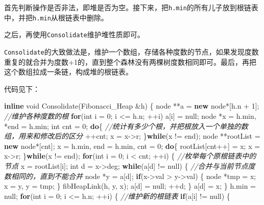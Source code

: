 \documentclass[]{article}
\newenvironment{Shaded}{}{}
\newcommand{\CommentTok}[1]{\textcolor[rgb]{0.38,0.63,0.69}{\textit{#1}}}
\newcommand{\ControlFlowTok}[1]{\textcolor[rgb]{0.00,0.44,0.13}{\textbf{#1}}}
\newcommand{\DataTypeTok}[1]{\textcolor[rgb]{0.56,0.13,0.00}{#1}}
\newcommand{\DecValTok}[1]{\textcolor[rgb]{0.25,0.63,0.44}{#1}}
\newcommand{\KeywordTok}[1]{\textcolor[rgb]{0.00,0.44,0.13}{\textbf{#1}}}
\newcommand{\NormalTok}[1]{#1}
\begin{document}
\begin{itemize}
  首先判断操作是否非法，即堆是否为空。接下来，把\texttt{h.min}的所有儿子放到根链表中，并把\texttt{h.min}从根链表中删除。

  之后，再使用\texttt{Consolidate}维护堆性质即可。

  \texttt{Consolidate}的大致做法是，维护一个数组，存储各种度数的节点，如果发现度数重复的就合并为度数+1的，直到整个森林没有两棵树度数相同即可。最后，再把这个数组拉成一条链，构成堆的根链表。

  代码见下：

\begin{Shaded}
\begin{Highlighting}[]
\KeywordTok{inline} \DataTypeTok{void}\NormalTok{ Consolidate(Fibonacci_Heap &h) \{}
\NormalTok{    node **a = }\KeywordTok{new}\NormalTok{ node*[h.n + }\DecValTok{1}\NormalTok{]; }\CommentTok{//维护各种度数的根}
    \ControlFlowTok{for}\NormalTok{(}\DataTypeTok{int}\NormalTok{ i = }\DecValTok{0}\NormalTok{; i <= h.n; ++i) a[i] = null;}
\NormalTok{    node *x = h.min, *end = h.min;}
    \DataTypeTok{int}\NormalTok{ cnt = }\DecValTok{0}\NormalTok{;}
    \ControlFlowTok{do}\NormalTok{\{ }\CommentTok{//统计有多少个根，并把根放入一个单独的数组，用来和修改后的区分}
\NormalTok{        ++cnt;}
\NormalTok{        x = x->r;}
\NormalTok{    \}}\ControlFlowTok{while}\NormalTok{(x != end);}
\NormalTok{    node **rootList = }\KeywordTok{new}\NormalTok{ node*[cnt];}
\NormalTok{    x = h.min, end = h.min, cnt = }\DecValTok{0}\NormalTok{;}
    \ControlFlowTok{do}\NormalTok{\{}
\NormalTok{        rootList[cnt++] = x;}
\NormalTok{        x = x->r;}
\NormalTok{    \}}\ControlFlowTok{while}\NormalTok{(x != end);}
    \ControlFlowTok{for}\NormalTok{(}\DataTypeTok{int}\NormalTok{ i = }\DecValTok{0}\NormalTok{; i < cnt; ++i) \{ }\CommentTok{//枚举每个原根链表中的节点}
\NormalTok{        x = rootList[i];}
        \DataTypeTok{int}\NormalTok{ d = x->deg;}
        \ControlFlowTok{while}\NormalTok{(a[d] != null) \{ }\CommentTok{//合并与当前节点度数相同的，直到不能合并}
\NormalTok{            node *y = a[d];}
            \ControlFlowTok{if}\NormalTok{(x->val > y->val) \{}
\NormalTok{                node *tmp = x;}
\NormalTok{                x = y, y = tmp;}
\NormalTok{            \}}
\NormalTok{            fibHeapLink(h, y, x);}
\NormalTok{            a[d] = null;}
\NormalTok{            ++d;}
\NormalTok{        \}}
\NormalTok{        a[d] = x;}
\NormalTok{    \}}
\NormalTok{    h.min = null;}
    \ControlFlowTok{for}\NormalTok{(}\DataTypeTok{int}\NormalTok{ i = }\DecValTok{0}\NormalTok{; i <= h.n; ++i) \{ }\CommentTok{//维护新的根链表}
        \ControlFlowTok{if}\NormalTok{(a[i] != null) \{}

\end{Highlighting}
\end{Shaded}
\end{itemize}
\end{document}
